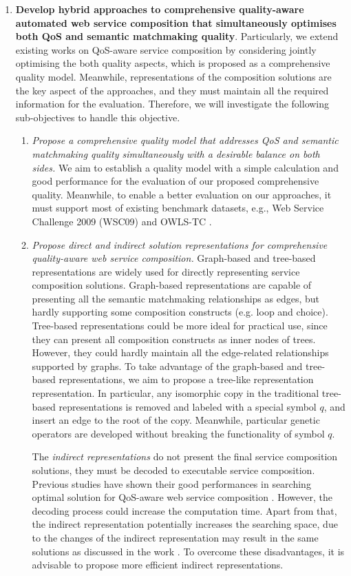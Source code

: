 \begin{enumerate}
  \item \label{Obj:1} \textbf{Develop hybrid approaches to comprehensive quality-aware automated web service composition that simultaneously optimises both QoS and semantic matchmaking quality}. Particularly, we extend existing works on QoS-aware service composition by considering jointly optimising the both quality aspects, which is proposed as a comprehensive quality model. Meanwhile, representations of the composition solutions are the key aspect of the approaches, and they must maintain all the required information for the evaluation. Therefore, we will investigate the following sub-objectives to handle this objective.
  \begin{enumerate}
    \item \emph{Propose a comprehensive quality model that addresses QoS and semantic matchmaking quality simultaneously with a desirable balance on both sides.} We aim to establish a quality model with a simple calculation and good performance for the evaluation of our proposed comprehensive quality. Meanwhile, to enable a better evaluation on our approaches, it must support most of existing benchmark datasets, e.g., Web Service Challenge 2009 (WSC09)\cite{kona2009wsc} and OWLS-TC \cite{kuster2008opossum}.
    
    \item \emph{Propose direct and indirect solution representations for comprehensive quality-aware web service composition.} Graph-based and tree-based representations are widely used for directly representing service composition solutions. Graph-based representations are capable of presenting all the semantic matchmaking relationships as edges, but hardly supporting some composition constructs (e.g. loop and choice). Tree-based representations could be more ideal for practical use, since they can present all composition constructs as inner nodes of trees. However, they could hardly maintain all the edge-related relationships supported by graphs. To take advantage of the graph-based and tree-based representations, we aim to propose a tree-like representation representation. In particular, any isomorphic copy in the traditional tree-based representations is removed and labeled with a special symbol $q$, and insert an edge to the root of the copy. Meanwhile, particular genetic operators are developed without breaking the functionality of symbol $q$.
    
    The \emph{indirect representations} do not present the final service composition solutions, they must be decoded to executable service composition. Previous studies have shown their good performances in searching optimal solution for QoS-aware web service composition \cite{da2016memetic,da2016particle}. However, the decoding process could increase the computation time. Apart from that, the indirect representation potentially increases the searching space, due to the changes of the indirect representation may result in the same solutions as discussed in the work \cite{da2016particle}. To overcome these disadvantages, it is advisable to propose more efficient indirect representations.
    

\end{enumerate}
\end{enumerate}
